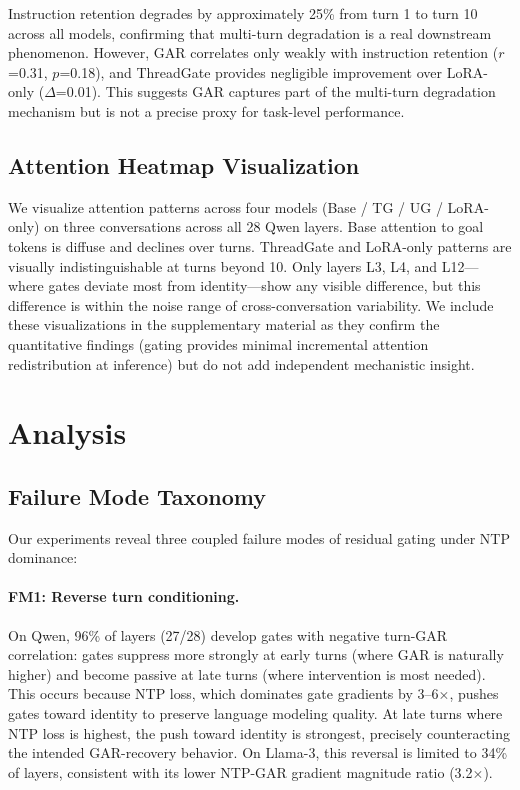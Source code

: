 \documentclass[11pt,a4paper]{article}
\begin{document}
Instruction retention degrades by approximately 25\% from turn 1 to turn 10 across all models, confirming that multi-turn degradation is a real downstream phenomenon. However, GAR correlates only weakly with instruction retention ($r$=0.31, $p$=0.18), and ThreadGate provides negligible improvement over LoRA-only ($\Delta$=0.01). This suggests GAR captures part of the multi-turn degradation mechanism but is not a precise proxy for task-level performance.

\subsection{Attention Heatmap Visualization}

We visualize attention patterns across four models (Base / TG / UG / LoRA-only) on three conversations across all 28 Qwen layers. Base attention to goal tokens is diffuse and declines over turns. ThreadGate and LoRA-only patterns are visually indistinguishable at turns beyond 10. Only layers L3, L4, and L12---where gates deviate most from identity---show any visible difference, but this difference is within the noise range of cross-conversation variability. We include these visualizations in the supplementary material as they confirm the quantitative findings (gating provides minimal incremental attention redistribution at inference) but do not add independent mechanistic insight.

\section{Analysis}

\subsection{Failure Mode Taxonomy}

Our experiments reveal three coupled failure modes of residual gating under NTP dominance:

\paragraph{FM1: Reverse turn conditioning.}
On Qwen, 96\% of layers (27/28) develop gates with negative turn-GAR correlation: gates suppress more strongly at early turns (where GAR is naturally higher) and become passive at late turns (where intervention is most needed). This occurs because NTP loss, which dominates gate gradients by 3--6$\times$, pushes gates toward identity to preserve language modeling quality. At late turns where NTP loss is highest, the push toward identity is strongest, precisely counteracting the intended GAR-recovery behavior. On Llama-3, this reversal is limited to 34\% of layers, consistent with its lower NTP-GAR gradient magnitude ratio (3.2$\times$).
\end{document}
